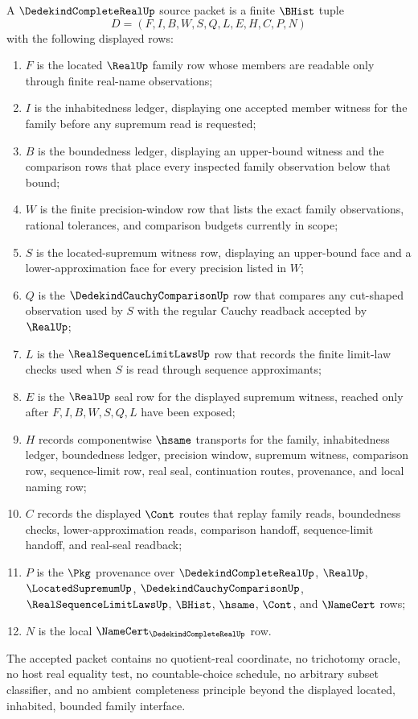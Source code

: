 \begin{definition}
\label{def:dedekind-complete-real-namecert-source}
A $\DedekindCompleteRealUp$ source packet is a finite $\BHist$ tuple
$$
D=(F,I,B,W,S,Q,L,E,H,C,P,N)
$$
with the following displayed rows:
\begin{enumerate}
\item $F$ is the located $\RealUp$ family row whose members are readable only through finite real-name observations;
\item $I$ is the inhabitedness ledger, displaying one accepted member witness for the family before any supremum read is requested;
\item $B$ is the boundedness ledger, displaying an upper-bound witness and the comparison rows that place every inspected family observation below that bound;
\item $W$ is the finite precision-window row that lists the exact family observations, rational tolerances, and comparison budgets currently in scope;
\item $S$ is the located-supremum witness row, displaying an upper-bound face and a lower-approximation face for every precision listed in $W$;
\item $Q$ is the $\DedekindCauchyComparisonUp$ row that compares any cut-shaped observation used by $S$ with the regular Cauchy readback accepted by $\RealUp$;
\item $L$ is the $\RealSequenceLimitLawsUp$ row that records the finite limit-law checks used when $S$ is read through sequence approximants;
\item $E$ is the $\RealUp$ seal row for the displayed supremum witness, reached only after $F,I,B,W,S,Q,L$ have been exposed;
\item $H$ records componentwise $\hsame$ transports for the family, inhabitedness ledger, boundedness ledger, precision window, supremum witness, comparison row, sequence-limit row, real seal, continuation routes, provenance, and local naming row;
\item $C$ records the displayed $\Cont$ routes that replay family reads, boundedness checks, lower-approximation reads, comparison handoff, sequence-limit handoff, and real-seal readback;
\item $P$ is the $\Pkg$ provenance over $\DedekindCompleteRealUp$, $\RealUp$, $\LocatedSupremumUp$, $\DedekindCauchyComparisonUp$, $\RealSequenceLimitLawsUp$, $\BHist$, $\hsame$, $\Cont$, and $\NameCert$ rows;
\item $N$ is the local $\NameCert_{\DedekindCompleteRealUp}$ row.
\end{enumerate}
The accepted packet contains no quotient-real coordinate, no trichotomy oracle, no host real equality test, no countable-choice schedule, no arbitrary subset classifier, and no ambient completeness principle beyond the displayed located, inhabited, bounded family interface.
\end{definition}

